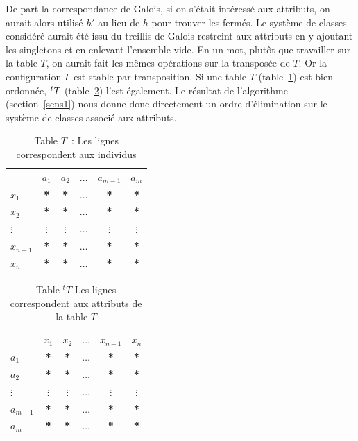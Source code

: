 \documentclass[a4paper]{report}
\renewcommand{\textbf}[1]{\begingroup\bfseries\mathversion{bold}#1\endgroup}
\begin{document}
De part la correspondance de Galois, si on s'était intéressé aux attributs, on aurait alors utilisé $h'$ au lieu de $h$ pour trouver les fermés. Le système de classes considéré aurait été issu du treillis de Galois restreint aux attributs en 
y ajoutant les singletons et en enlevant l'ensemble vide. En un mot, plutôt que travailler sur la table $T$, on aurait fait les mêmes opérations sur la transposée de $T$.
Or la configuration $\Gamma$ est stable par transposition. Si une table $T$ (table~\ref{nontrans}) est bien ordonnée, $\mathstrut^t T$ (table~\ref{trans}) l'est également. 
Le résultat de l'algorithme (section~\ref{sens1}) nous donne donc directement un ordre d'élimination sur le système de classes associé aux attributs.


\begin{table}[htb]
  \centering
\begin{tabular}{lccccc}
 & $a_1$ & $a_2$ & $\hdots$ & $a_{m-1}$ & $a_m$\\
$x_1$ & \textbf{*} & \textbf{*} & $\hdots$ & \textbf{*} & \textbf{*}\\
$x_2$ & \textbf{*} & \textbf{*} & $\hdots$ & \textbf{*} & \textbf{*}\\
$\vdots$ & $\vdots$ & $\vdots$ & $\hdots$ & $\vdots$ & $\vdots$\\
$x_{n-1}$ & \textbf{*} & \textbf{*} & $\hdots$ & \textbf{*} & \textbf{*}\\
$x_n$ & \textbf{*} & \textbf{*} & $\hdots$ & \textbf{*} & \textbf{*}
\end{tabular}
\caption{Table $T$~: Les lignes correspondent aux individus}
\label{nontrans}
\end{table}

\begin{table}[htb]
  \centering
\begin{tabular}{lccccc}
 & $x_1$ & $x_2$ & $\hdots$ & $x_{n-1}$ & $x_n$\\
$a_1$ & \textbf{*} & \textbf{*} & $\hdots$ & \textbf{*} & \textbf{*}\\
$a_2$ & \textbf{*} & \textbf{*} & $\hdots$ & \textbf{*} & \textbf{*}\\
$\vdots$ & $\vdots$ & $\vdots$ & $\hdots$ & $\vdots$ & $\vdots$\\
$a_{m-1}$ & \textbf{*} & \textbf{*} & $\hdots$ & \textbf{*} & \textbf{*}\\
$a_m$ & \textbf{*} & \textbf{*} & $\hdots$ & \textbf{*} & \textbf{*}
\end{tabular}
\caption{Table ${}^t T$ Les lignes correspondent aux attributs de la table $T$}
\label{trans}
\end{table}
\end{document}
